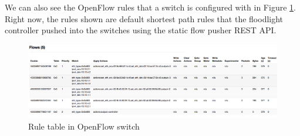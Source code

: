 \documentclass[paper=a4, fontsize=12pt]{scrartcl}	%
\numberwithin{equation}{section}		%
\numberwithin{figure}{section}			%
\numberwithin{table}{section}				%
\begin{document}
We can also see the OpenFlow rules that a switch is configured with in Figure \ref{Fig 4.3}. Right now, the rules shown are default shortest path rules that the floodlight controller pushed into the switches using the static flow pusher REST API.
\begin{figure}[H]
\begin{center}
\includegraphics[scale=0.35]{rules.png}   
\end{center}
 \caption{Rule table in OpenFlow switch}
 \label{Fig 4.3}
\end{figure}
\end{document}
